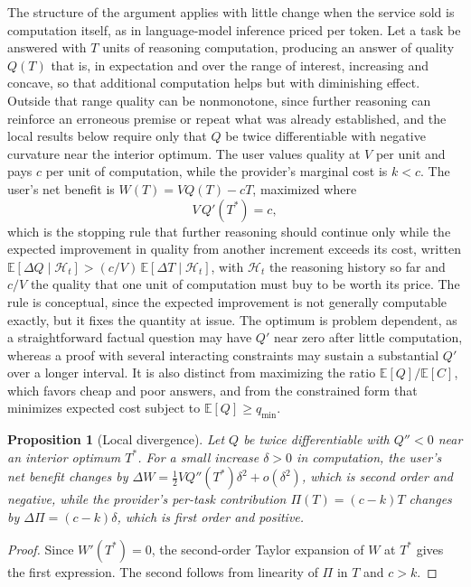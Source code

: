 \documentclass[11pt]{article}
\newtheorem{proposition}{Proposition}
\theoremstyle{remark}
\newcommand{\E}{\mathbb{E}}
\begin{document}
The structure of the argument applies with little change when the service sold is computation itself, as in language-model inference priced per token. Let a task be answered with $T$ units of reasoning computation, producing an answer of quality $Q(T)$ that is, in expectation and over the range of interest, increasing and concave, so that additional computation helps but with diminishing effect. Outside that range quality can be nonmonotone, since further reasoning can reinforce an erroneous premise or repeat what was already established, and the local results below require only that $Q$ be twice differentiable with negative curvature near the interior optimum. The user values quality at $V$ per unit and pays $c$ per unit of computation, while the provider's marginal cost is $k<c$. The user's net benefit is $W(T)=VQ(T)-cT$, maximized where
\[
V\,Q'(T^{*})=c ,
\]
which is the stopping rule that further reasoning should continue only while the expected improvement in quality from another increment exceeds its cost, written $\E[\Delta Q\mid \mathcal H_t] > (c/V)\,\E[\Delta T\mid \mathcal H_t]$, with $\mathcal H_t$ the reasoning history so far and $c/V$ the quality that one unit of computation must buy to be worth its price. The rule is conceptual, since the expected improvement is not generally computable exactly, but it fixes the quantity at issue. The optimum is problem dependent, as a straightforward factual question may have $Q'$ near zero after little computation, whereas a proof with several interacting constraints may sustain a substantial $Q'$ over a longer interval. It is also distinct from maximizing the ratio $\E[Q]/\E[C]$, which favors cheap and poor answers, and from the constrained form that minimizes expected cost subject to $\E[Q]\ge q_{\min}$.

\begin{proposition}[Local divergence]\label{prop:usage}
Let $Q$ be twice differentiable with $Q''<0$ near an interior optimum $T^{*}$. For a small increase $\delta>0$ in computation, the user's net benefit changes by $\Delta W=\tfrac12 VQ''(T^{*})\delta^{2}+o(\delta^{2})$, which is second order and negative, while the provider's per-task contribution $\Pi(T)=(c-k)T$ changes by $\Delta\Pi=(c-k)\delta$, which is first order and positive.
\end{proposition}

\begin{proof}
Since $W'(T^{*})=0$, the second-order Taylor expansion of $W$ at $T^{*}$ gives the first expression. The second follows from linearity of $\Pi$ in $T$ and $c>k$.
\end{proof}
\end{document}

